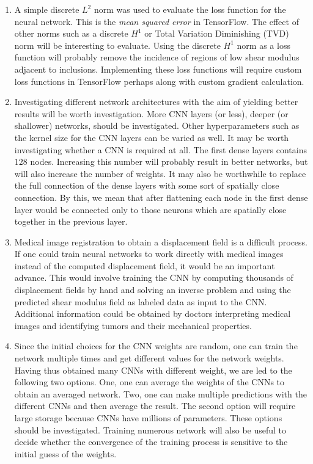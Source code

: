 \documentclass[12pt]{article}
\begin{document}
\begin{enumerate}
\item{A simple discrete $L^2$ norm was used to evaluate the loss function for the neural network. This is the \textit{mean squared error} in TensorFlow. The effect of other norms such as a discrete $H^1$ or Total Variation Diminishing (TVD) norm will be interesting to evaluate. Using the discrete $H^1$ norm as a loss function will probably remove the incidence of regions of low shear modulus adjacent to inclusions. Implementing these loss functions will require custom loss functions in TensorFlow perhaps along with custom gradient calculation.}
\item{Investigating different network architectures with the aim of yielding better results will be worth investigation. More CNN layers (or less), deeper (or shallower) networks, should be investigated. Other hyperparameters such as the kernel size for the CNN layers can be varied as well. It may be worth investigating whether a CNN is required at all. The first dense layers contains $128$ nodes. Increasing this number will probably result in better networks, but will also increase the number of weights. It may also be worthwhile to replace the full connection of the dense layers with some sort of spatially close connection. By this, we mean that after flattening each node in the first dense layer would be connected only to those neurons which are spatially close together in the previous layer.}
\item{Medical image registration to obtain a displacement field is a difficult process. If one could train neural networks to work directly with medical images instead of the computed displacement field, it would be an important advance. This would involve training the CNN by computing thousands of displacement fields by hand and solving an inverse problem and using the predicted shear modulus field as labeled data as input to the CNN. Additional information could be obtained by doctors interpreting medical images and identifying tumors and their mechanical properties.}
\item{Since the initial choices for the CNN weights are random, one can train the network multiple times and get different values for the network weights. Having thus obtained many CNNs with different weight, we are led to the following two options. One, one can average the weights of the CNNs to obtain an averaged network. Two, one can make multiple predictions with the different CNNs and then average the result. The second option will require large storage because CNNs have millions of parameters. These options should be investigated. Training numerous network will also be useful to decide whether the convergence of the training process is sensitive to the initial guess of the weights.}

\end{enumerate}
\end{document}
